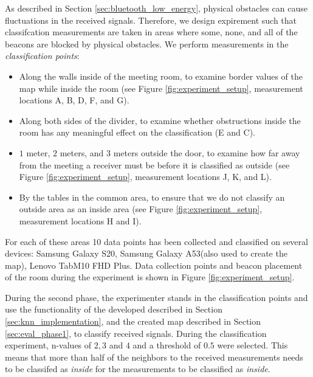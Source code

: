 As described in Section \ref{sec:bluetooth_low_energy}, physical obstacles can cause fluctuations in the received signals. 
Therefore, we design expirement such that classifcation measurements are taken in areas where some, none, and all of the beacons are blocked by physical obstacles. 
We perform measurements in the \textit{classification points}:
\begin{itemize}
    \item Along the walls inside of the meeting room, to examine border values of the map while inside the room (see Figure \ref{fig:experiment_setup}, measurement locations A, B, D, F, and G).
    \item Along both sides of the divider, to examine whether obstructions inside the room has any meaningful effect on the classification (E and C).
    \item $1$ meter, $2$ meters, and $3$ meters outside the door, to examine how far away from the meeting a receiver must be before it is classified as outside (see Figure \ref{fig:experiment_setup}, measurement locations J, K, and L).
    \item By the tables in the common area, to ensure that we do not classify an outside area as an inside area (see Figure \ref{fig:experiment_setup}, measurement locations H and I).
\end{itemize}
For each of these areas 10 data points has been collected and classified on several devices: Samsung Galaxy S20, Samsung Galaxy A53(also used to create the map), Lenovo TabM10 FHD Plus.
Data collection points and beacon placement of the room during the experiment is shown in Figure \ref{fig:experiment_setup}. 

During the second phase, the experimenter stands in the classification points and use the functionality of the developed described in Section \ref{sec:knn_implementation}, and the created map described in Section \ref{sec:eval_phase1}, to classify received signals. 
During the classification experiment, n-values of $2,3$ and $4$ and a threshold of $0.5$ were selected. 
This means that more than half of the neighbors to the received measurements needs to be classifed as \textit{inside} for the measurements to be classified as \textit{inside}.

